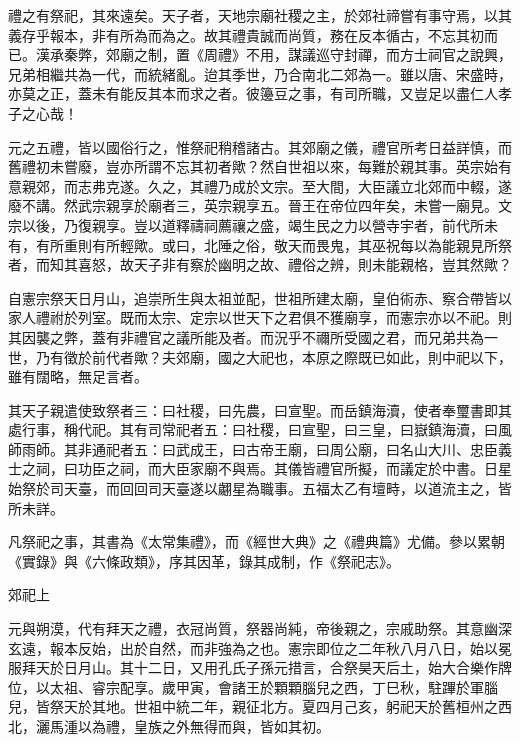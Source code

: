 
\begin{pinyinscope}

 禮之有祭祀，其來遠矣。天子者，天地宗廟社稷之主，於郊社禘嘗有事守焉，以其義存乎報本，非有所為而為之。故其禮貴誠而尚質，務在反本循古，不忘其初而已。漢承秦弊，郊廟之制，置《周禮》不用，謀議巡守封禪，而方士祠官之說興，兄弟相繼共為一代，而統緒亂。迨其季世，乃合南北二郊為一。雖以唐、宋盛時，亦莫之正，蓋未有能反其本而求之者。彼籩豆之事，有司所職，又豈足以盡仁人孝子之心哉！



 元之五禮，皆以國俗行之，惟祭祀稍稽諸古。其郊廟之儀，禮官所考日益詳慎，而舊禮初未嘗廢，豈亦所謂不忘其初者歟？然自世祖以來，每難於親其事。英宗始有意親郊，而志弗克遂。久之，其禮乃成於文宗。至大間，大臣議立北郊而中輟，遂廢不講。然武宗親享於廟者三，英宗親享五。晉王在帝位四年矣，未嘗一廟見。文宗以後，乃復親享。豈以道釋禱祠薦禳之盛，竭生民之力以營寺宇者，前代所未有，有所重則有所輕歟。或曰，北陲之俗，敬天而畏鬼，其巫祝每以為能親見所祭者，而知其喜怒，故天子非有察於幽明之故、禮俗之辨，則未能親格，豈其然歟？



 自憲宗祭天日月山，追崇所生與太祖並配，世祖所建太廟，皇伯術赤、察合帶皆以家人禮祔於列室。既而太宗、定宗以世天下之君俱不獲廟享，而憲宗亦以不祀。則其因襲之弊，蓋有非禮官之議所能及者。而況乎不禰所受國之君，而兄弟共為一世，乃有徵於前代者歟？夫郊廟，國之大祀也，本原之際既已如此，則中祀以下，雖有闊略，無足言者。



 其天子親遣使致祭者三：曰社稷，曰先農，曰宣聖。而岳鎮海瀆，使者奉璽書即其處行事，稱代祀。其有司常祀者五：曰社稷，曰宣聖，曰三皇，曰嶽鎮海瀆，曰風師雨師。其非通祀者五：曰武成王，曰古帝王廟，曰周公廟，曰名山大川、忠臣義士之祠，曰功臣之祠，而大臣家廟不與焉。其儀皆禮官所擬，而議定於中書。日星始祭於司天臺，而回回司天臺遂以翽星為職事。五福太乙有壇畤，以道流主之，皆所未詳。



 凡祭祀之事，其書為《太常集禮》，而《經世大典》之《禮典篇》尤備。參以累朝《實錄》與《六條政類》，序其因革，錄其成制，作《祭祀志》。



 郊祀上



 元與朔漠，代有拜天之禮，衣冠尚質，祭器尚純，帝後親之，宗戚助祭。其意幽深玄遠，報本反始，出於自然，而非強為之也。憲宗即位之二年秋八月八日，始以冕服拜天於日月山。其十二日，又用孔氏子孫元措言，合祭昊天后土，始大合樂作牌位，以太祖、睿宗配享。歲甲寅，會諸王於顆顆腦兒之西，丁巳秋，駐蹕於軍腦兒，皆祭天於其地。世祖中統二年，親征北方。夏四月己亥，躬祀天於舊桓州之西北，灑馬湩以為禮，皇族之外無得而與，皆如其初。




\end{pinyinscope}
